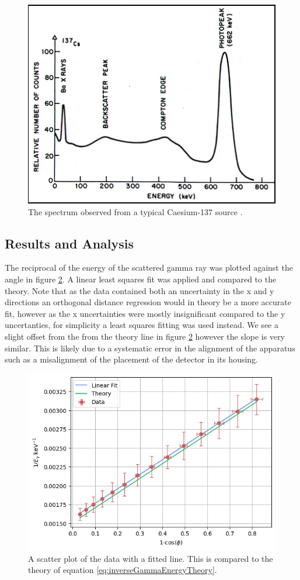 \documentclass[%
reprint,
amsmath,amssymb,
aps,
]{revtex4-2}
\begin{document}
			\begin{figure}
				\includegraphics[width=0.85\columnwidth]{gammaspectrum.jpg}
				\caption{\label{fig:gammaSpectrum}The spectrum observed from a typical Caesium-137 source \cite{vcu}.}
			\end{figure}
		
		\subsection{Results and Analysis}
			The reciprocal of the energy of the scattered gamma ray was plotted against the angle in figure \ref{fig:energyPlot}. A linear least squares fit was applied and compared to the theory. Note that as the data contained both an uncertainty in the x and y directions an orthogonal distance regression would in theory be a more accurate fit, however as the x uncertainties were mostly insignificant compared to the y uncertanties, for simplicity a least squares fitting was used instead. We see a slight offset from the from the theory line in figure \ref{fig:energyPlot} however the slope is very similar. This is likely due to a systematic error in the alignment of the apparatus such as a misalignment of the placement of the detector in its housing.\\
			
			\begin{figure}
				\includegraphics[width=0.85\columnwidth]{energyPlot.png}
				\caption{\label{fig:energyPlot}A scatter plot of the data with a fitted line. This is compared to the theory of equation \ref{eq:inverseGammaEnergyTheory}.}
			\end{figure}
			
\end{document}
